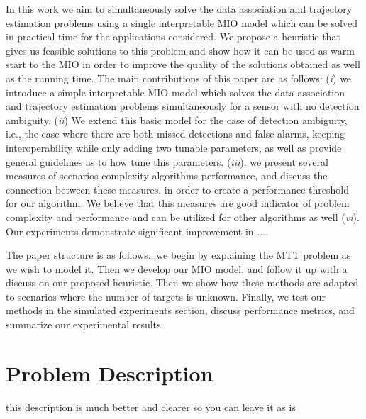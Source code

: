 \documentclass[journal]{IEEEtran}
\begin{document}
In this work we aim to simultaneously solve the data association and trajectory estimation problems using a single interpretable {\color{red} MIO} model which can be solved in practical time for the applications considered. We propose a heuristic that gives us feasible solutions to this problem and show how it can be used as warm start to the MIO in order to improve the quality of the solutions obtained {\color{red} as well as the running time. The main contributions of this paper are as follows: (\textit{i}) we introduce a simple interpretable MIO model which solves the data association and trajectory estimation problems simultaneously for a sensor with no detection ambiguity. (\textit{ii}) We extend this basic model for the case of detection ambiguity, i.e., the case where there are both missed detections and false alarms, keeping interoperability while only adding two tunable parameters, as well as provide general guidelines as to how tune this parameters. (\textit{iii}). we present several measures of scenarios complexity algorithms performance, and discuss the connection between these measures, in order to create a performance threshold for our algorithm. We believe that this measures are good indicator of problem complexity and performance and can be utilized for other algorithms as well}  (\textit{vi}). Our experiments demonstrate significant improvement in ....

The paper structure is as follows...we begin by explaining the MTT problem as we wish to model it. Then we develop our MIO model, and follow it up with a discuss on our proposed heuristic. Then we show how these methods are adapted to scenarios where the number of targets is unknown. Finally, we test our methods in the simulated experiments section, discuss performance metrics, and summarize our experimental results. 


\section{Problem Description}
{\color{red} this description is much better and clearer so you can leave it as is}
\end{document}
